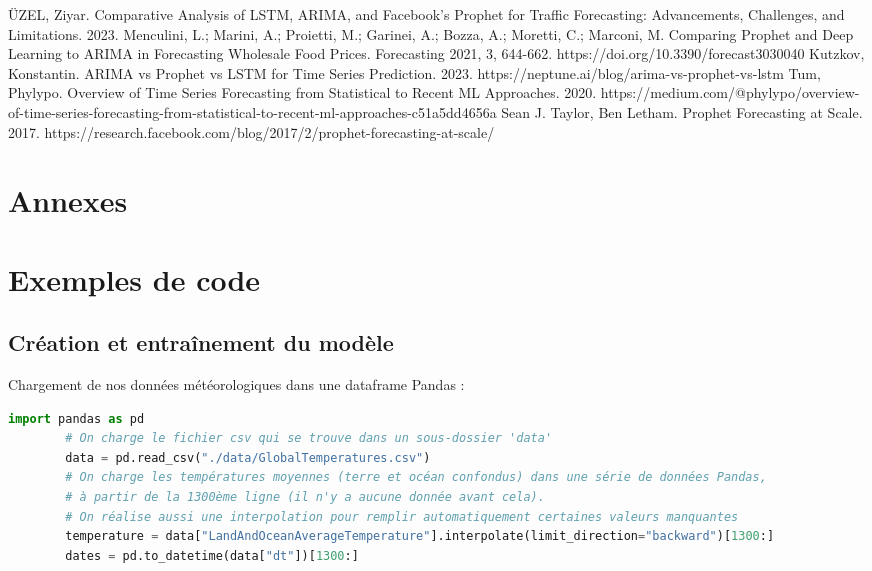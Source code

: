 \documentclass[french]{article}
\begin{document}
    \newpage
    \begin{thebibliography}{5}
         ÜZEL, Ziyar. Comparative Analysis of LSTM, ARIMA, and Facebook’s Prophet for Traffic Forecasting: Advancements, Challenges, and Limitations. 2023. 
         Menculini, L.; Marini, A.; Proietti, M.; Garinei, A.; Bozza, A.; Moretti, C.; Marconi, M. Comparing Prophet and Deep Learning to ARIMA in Forecasting Wholesale Food Prices. Forecasting 2021, 3, 644-662. https://doi.org/10.3390/forecast3030040
         Kutzkov, Konstantin. ARIMA vs Prophet vs LSTM for Time Series Prediction. 2023. https://neptune.ai/blog/arima-vs-prophet-vs-lstm
         Tum, Phylypo. Overview of Time Series Forecasting from Statistical to Recent ML Approaches. 2020. https://medium.com/@phylypo/overview-of-time-series-forecasting-from-statistical-to-recent-ml-approaches-c51a5dd4656a
         Sean J. Taylor, Ben Letham. Prophet Forecasting at Scale. 2017. https://research.facebook.com/blog/2017/2/prophet-forecasting-at-scale/
    \end{thebibliography}

    \appendix
    \newpage
    \section*{Annexes \huge \centering}
    \section*{Exemples de code}
    \label{sec:code}
    \subsection*{Création et entraînement du modèle}
    Chargement de nos données météorologiques dans une dataframe Pandas :
    \begin{lstlisting}[language=Python]
        import pandas as pd
        # On charge le fichier csv qui se trouve dans un sous-dossier 'data'
        data = pd.read_csv("./data/GlobalTemperatures.csv")
        # On charge les températures moyennes (terre et océan confondus) dans une série de données Pandas,
        # à partir de la 1300ème ligne (il n'y a aucune donnée avant cela).
        # On réalise aussi une interpolation pour remplir automatiquement certaines valeurs manquantes
        temperature = data["LandAndOceanAverageTemperature"].interpolate(limit_direction="backward")[1300:]
        dates = pd.to_datetime(data["dt"])[1300:]
    \end{lstlisting}
\end{document}
